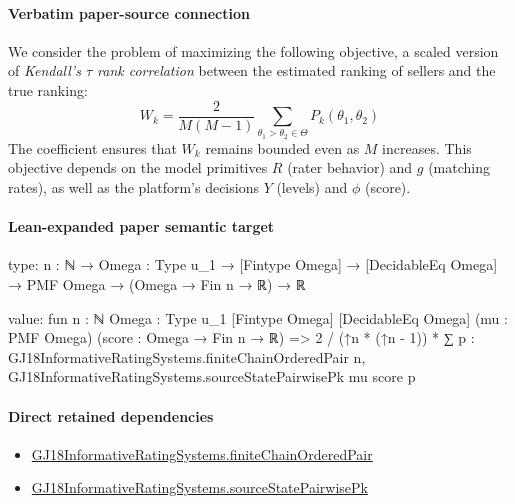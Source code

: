 \documentclass[10pt]{article}
\begin{document}
\paragraph{Verbatim paper-source connection}
\begin{ReviewVerbatim}
We consider the problem of maximizing the following objective, a scaled version of {\em Kendall's $\tau$ rank correlation} between the estimated ranking of sellers and the true ranking:
\begin{equation}
\label{eq:objective}
W_k = \frac{2}{M(M-1)}\sum_{\theta_1 > \theta_2 \in \Theta} P_k(\theta_1, \theta_2)
\end{equation}
The coefficient ensures that ${W}_k$ remains bounded even as $M$ increases. This objective depends on the model primitives $R$ (rater behavior) and $g$ (matching rates), as well as the platform's decisions $Y$ (levels) and $\phi$ (score).
\end{ReviewVerbatim}



\paragraph{Lean-expanded paper semantic target}
\begin{ReviewVerbatim}
type:
{n : ℕ} → {Omega : Type u_1} → [Fintype Omega] → [DecidableEq Omega] → PMF Omega → (Omega → Fin n → ℝ) → ℝ

value:
fun {n : ℕ} {Omega : Type u_1} [Fintype Omega] [DecidableEq Omega] (mu : PMF Omega) (score : Omega → Fin n → ℝ) =>
  2 / (↑n * (↑n - 1)) *
    ∑ p : GJ18InformativeRatingSystems.finiteChainOrderedPair n,
      GJ18InformativeRatingSystems.sourceStatePairwisePk mu score p
\end{ReviewVerbatim}

\paragraph{Direct retained dependencies}
\begin{itemize}\raggedright
\item \hyperlink{governing-declaration-490763321205956c}{GJ18\allowbreak{}Informative\allowbreak{}Rating\allowbreak{}Systems.\allowbreak{}finite\allowbreak{}Chain\allowbreak{}Ordered\allowbreak{}Pair}
\item \hyperlink{paper-prerequisite-e2953365ffe4a1ff}{GJ18\allowbreak{}Informative\allowbreak{}Rating\allowbreak{}Systems.\allowbreak{}source\allowbreak{}State\allowbreak{}Pairwise\allowbreak{}Pk}
\end{itemize}
\end{document}

